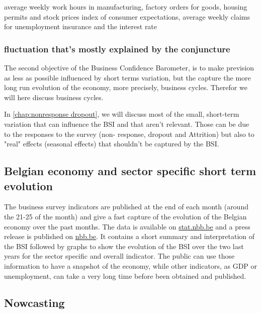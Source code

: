 \documentclass[12pt,a4paper,oneside]{book}
\begin{document}
average weekly work hours in manufacturing, factory orders for goods, housing permits and stock prices
 index of consumer expectations, average weekly claims for unemployment insurance and the interest rate
 

\subsubsection{fluctuation that's mostly explained by the conjuncture}
The second objective of the Business Confidence Barometer, is to make prevision as less as possible influenced by short terms variation, but the capture the more long run evolution of the economy, more precisely, business cycles. Therefor we will here discuss business cycles.

In \autoref{chap:nonresponse dropout}, we will discuss most of the small, short-term variation that can influence the BSI and that aren't relevant. Those can be due to the responses to the survey (non- response, dropout and Attrition) but also to "real" effects (seasonal effects) that shouldn't be captured by the BSI.

\subsection{Belgian economy and sector specific short term evolution}


The business survey indicators are published at the end of each month (around the 21-25 of the month) and give a fast capture of the evolution of the Belgian economy over the past months.
The data is available on \href{http://stat.nbb.be/Index.aspx?DataSetCode=BUSSURVM&Lang=en}{stat.nbb.be} and a press release is published on \href{http://www.nbb.be/doc/dq/e/conj.htm}{nbb.be}. 
It contains a short summary and interpretation of the BSI followed by graphs to show the evolution of the BSI over the two last years for the sector specific and overall indicator.
The public can use those information to have a snapshot of the economy, while other indicators, as GDP or unemployment, can take a very long time before been obtained and published.


\subsection{Nowcasting}
\end{document}
